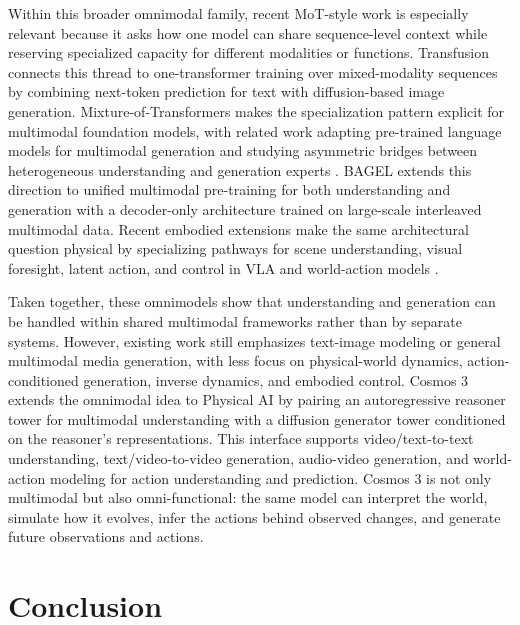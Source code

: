 \documentclass{llmxive}
\begin{document}
Within this broader omnimodal family, recent MoT-style work is especially relevant because it asks how one model can share sequence-level context while reserving specialized capacity for different modalities or functions.
Transfusion \citep{zhou2024transfusion} connects this thread to one-transformer training over mixed-modality sequences by combining next-token prediction for text with diffusion-based image generation.
Mixture-of-Transformers \citep{liang2024mot} makes the specialization pattern explicit for multimodal foundation models, with related work adapting pre-trained language models for multimodal generation and studying asymmetric bridges between heterogeneous understanding and generation experts \citep{shi2025lmfusion,wang2025hbridge}.
BAGEL \citep{deng2025bagel} extends this direction to unified multimodal pre-training for both understanding and generation with a decoder-only architecture trained on large-scale interleaved multimodal data.
Recent embodied extensions make the same architectural question physical by specializing pathways for scene understanding, visual foresight, latent action, and control in VLA and world-action models \citep{lv2025f1,cai2026internvlaa1,shou2026halo,bi2025motus,motubrain2026,li2026causalworld,tencent2026hyembodied}.

Taken together, these omnimodels show that understanding and generation can be handled within shared multimodal frameworks rather than by separate systems.
However, existing work still emphasizes text-image modeling or general multimodal media generation, with less focus on physical-world dynamics, action-conditioned generation, inverse dynamics, and embodied control.
Cosmos 3 extends the omnimodal idea to Physical AI by pairing an autoregressive reasoner tower for multimodal understanding with a diffusion generator tower conditioned on the reasoner's representations.
This interface supports video/text-to-text understanding, text/video-to-video generation, audio-video generation, and world-action modeling for action understanding and prediction.
Cosmos 3 is not only multimodal but also omni-functional: the same model can interpret the world, simulate how it evolves, infer the actions behind observed changes, and generate future observations and actions.

\section{Conclusion}
\label{sec::conclusion}
\end{document}

